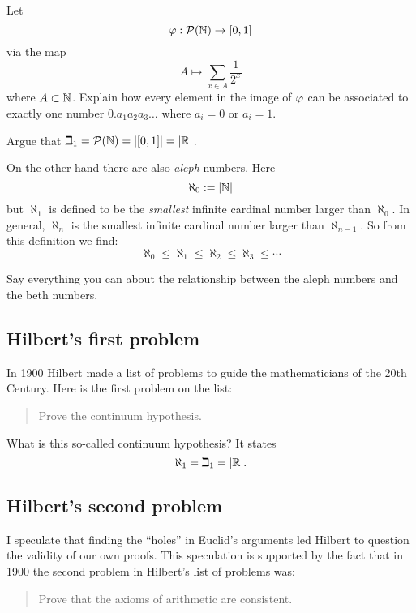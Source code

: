 \documentclass[nooutcomes]{ximera}
\begin{document}
\begin{question}
Let 
\[
\varphi: \mathcal{P}(\mathbb N) \to [0,1]
\]
via the map 
\[
A \mapsto \sum_{x\in A} \frac{1}{2^x}
\]
where $A\subset \mathbb N$. Explain how every element in the image of $\varphi$
can be associated to exactly one number $0.a_1a_2a_3\dots$ where $a_i=
0$ or $a_i=1$.
\end{question}

\begin{question}
Argue that $\beth_1 = \mathcal{P}(\mathbb N)= |[0,1]| = |\mathbb{R}|$.
\end{question}


On the other hand there are also \textit{aleph} numbers. Here
\[
\aleph_0 := |\mathbb N|
\]
but $\aleph_1$ is defined to be the \textit{smallest} infinite cardinal
number larger than $\aleph_0$. In general, $\aleph_n$ is the smallest
infinite cardinal number larger than $\aleph_{n-1}$. So from this
definition we find:
\[
\aleph_0 \le \aleph_1 \le \aleph_2 \le \aleph_3 \le \cdots
\]

\begin{question}
Say everything you can about the relationship between the aleph
numbers and the beth numbers.
\end{question}

\subsection*{Hilbert's first problem}


In 1900 Hilbert made a list of problems to guide the mathematicians
of the 20th Century. Here is the first problem on the list:

\begin{quote}
Prove the continuum hypothesis.
\end{quote}

What is this so-called continuum hypothesis? It states
\[
\aleph_1 = \beth_1 = |\mathbb{R}|.
\]

\subsection*{Hilbert's second problem}

I speculate that finding the ``holes'' in Euclid's arguments led
Hilbert to question the validity of our own proofs. This speculation
is supported by the fact that in 1900 the second problem in Hilbert's
list of problems was:
\begin{quote}
Prove that the axioms of arithmetic are consistent.
\end{quote}
\end{document}
